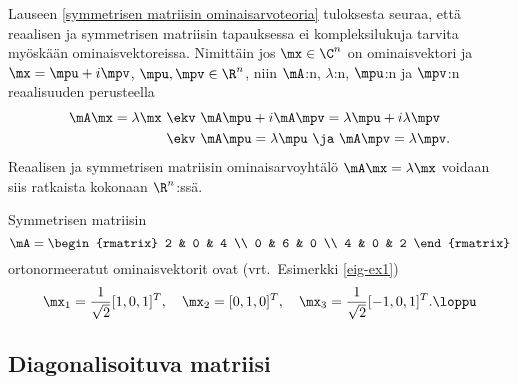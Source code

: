 Lauseen \ref{symmetrisen matriisin ominaisarvoteoria} tuloksesta seuraa, että reaalisen ja 
symmetrisen matriisin tapauksessa ei kompleksilukuja tarvita myöskään ominaisvektoreissa. 
Nimittäin jos $\mx\in\C^n$ on ominaisvektori ja $\mx=\mpu+i\mpv$, $\mpu,\mpv\in\R^n$, niin 
$\mA$:n, $\lambda$:n, $\mpu$:n ja $\mpv$:n reaalisuuden perusteella
\begin{align*}
\mA\mx=\lambda\mx \ &\ekv \ \mA\mpu+i\mA\mpv=\lambda\mpu+i\lambda\mpv \\
&\ekv \ \mA\mpu=\lambda\mpu \ \ja \ \mA\mpv=\lambda\mpv.
\end{align*}
Reaalisen ja symmetrisen matriisin ominaisarvoyhtälö $\mA\mx=\lambda\mx$ voidaan siis ratkaista
kokonaan $\R^n$:ssä.
\begin{Exa} \label{eig-ex5} Symmetrisen matriisin
\[
\mA=\begin{rmatrix} 2 & 0 & 4 \\ 0 & 6 & 0 \\ 4 & 0 & 2 \end{rmatrix}
\]
ortonormeeratut ominaisvektorit ovat (vrt.\ Esimerkki \ref{eig-ex1})
\[
\mx_1=\frac{1}{\sqrt{2}}[1,0,1]^T, \quad 
\mx_2=[0,1,0]^T, \quad 
\mx_3=\frac{1}{\sqrt{2}}[-1,0,1]^T. \loppu
\]
\end{Exa}

\subsection*{Diagonalisoituva matriisi}

